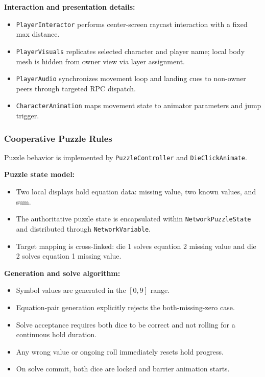 \textbf{Interaction and presentation details:}
\begin{itemize}
\item \texttt{PlayerInteractor} performs center-screen raycast interaction with a fixed max distance.
\item \texttt{PlayerVisuals} replicates selected character and player name; local body mesh is hidden from owner view via layer assignment.
\item \texttt{PlayerAudio} synchronizes movement loop and landing cues to non-owner peers through targeted RPC dispatch.
\item \texttt{CharacterAnimation} maps movement state to animator parameters and jump trigger.
\end{itemize}

\subsubsection*{Cooperative Puzzle Rules}
Puzzle behavior is implemented by \texttt{PuzzleController} and \texttt{DieClickAnimate}.

\textbf{Puzzle state model:}
\begin{itemize}
\item Two local displays hold equation data: missing value, two known values, and sum.
\item The authoritative puzzle state is encapsulated within \texttt{NetworkPuzzleState} and distributed through \texttt{NetworkVariable}.
\item Target mapping is cross-linked: die 1 solves equation 2 missing value and die 2 solves equation 1 missing value.
\end{itemize}

\newpage

\textbf{Generation and solve algorithm:}
\begin{itemize}
\item Symbol values are generated in the \([0,9]\) range.
\item Equation-pair generation explicitly rejects the both-missing-zero case.
\item Solve acceptance requires both dice to be correct and not rolling for a continuous hold duration.
\item Any wrong value or ongoing roll immediately resets hold progress.
\item On solve commit, both dice are locked and barrier animation starts.
\end{itemize}

